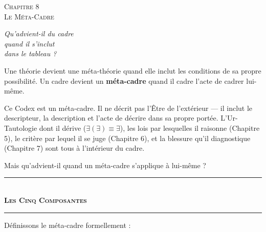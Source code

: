 \documentclass[10pt, openany, oneside]{book}
\renewcommand{\normalsize}{\fontsize{10}{13}\selectfont}
\renewcommand{\large}{\fontsize{11.5}{14}\selectfont}
\renewcommand{\huge}{\fontsize{17}{21}\selectfont}
\begin{document}
\newpage

\begin{center}
    {\huge\scshape Chapitre 8}\\[0.3em]
    {\large\scshape Le Méta-Cadre}
\end{center}

\vspace{1.5em}

\begin{center}
    \itshape
    Qu'advient-il du cadre\\
    quand il s'inclut\\
    dans le tableau ?
\end{center}

\vspace{2em}


\noindent Une théorie devient une méta-théorie quand elle inclut les conditions de sa propre possibilité. Un cadre devient un \textbf{méta-cadre} quand il cadre l'acte de cadrer lui-même.

Ce Codex est un méta-cadre. Il ne décrit pas l'Être de l'extérieur --- il inclut le descripteur, la description et l'acte de décrire dans sa propre portée. L'Ur-Tautologie dont il dérive ($\exists(\exists) \equiv \exists$), les lois par lesquelles il raisonne (Chapitre 5), le critère par lequel il se juge (Chapitre 6), et la blessure qu'il diagnostique (Chapitre 7) sont tous à l'intérieur du cadre.

Mais qu'advient-il quand un méta-cadre s'applique à lui-même ?

\vspace{1.5em}


\begin{center}
    \rule{0.3\textwidth}{0.4pt}\\[0.5em]
    {\normalsize\bfseries\scshape Les Cinq Composantes}\\[0.3em]
    \rule{0.3\textwidth}{0.4pt}
\end{center}

\vspace{1em}

\noindent Définissons le méta-cadre formellement :
\end{document}
